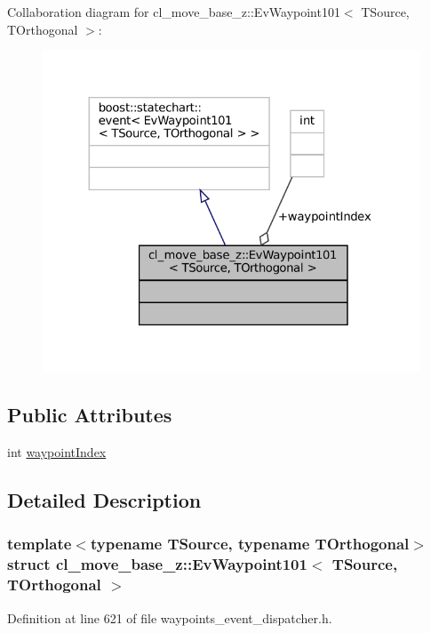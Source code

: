Collaboration diagram for cl\+\_\+move\+\_\+base\+\_\+z\+:\+:Ev\+Waypoint101$<$ T\+Source, T\+Orthogonal $>$\+:
\nopagebreak
\begin{figure}[H]
\begin{center}
\leavevmode
\includegraphics[width=324pt]{structcl__move__base__z_1_1EvWaypoint101__coll__graph}
\end{center}
\end{figure}
\subsection*{Public Attributes}
\begin{DoxyCompactItemize}
\item 
int \hyperlink{structcl__move__base__z_1_1EvWaypoint101_a18d1bd7e731e45e32874cb55c7a259c6}{waypoint\+Index}
\end{DoxyCompactItemize}


\subsection{Detailed Description}
\subsubsection*{template$<$typename T\+Source, typename T\+Orthogonal$>$\newline
struct cl\+\_\+move\+\_\+base\+\_\+z\+::\+Ev\+Waypoint101$<$ T\+Source, T\+Orthogonal $>$}



Definition at line 621 of file waypoints\+\_\+event\+\_\+dispatcher.\+h.



